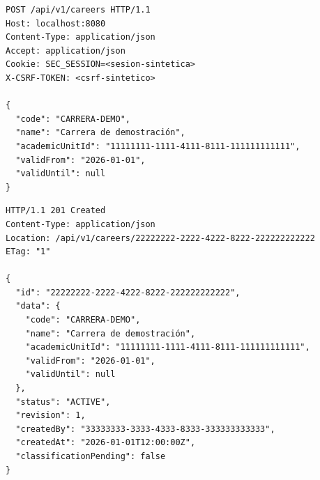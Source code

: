 \documentclass[12pt,a4paper]{report}
\begin{document}
\begin{Verbatim}[breaklines=true,breakanywhere=true,fontsize=\footnotesize]
POST /api/v1/careers HTTP/1.1
Host: localhost:8080
Content-Type: application/json
Accept: application/json
Cookie: SEC_SESSION=<sesion-sintetica>
X-CSRF-TOKEN: <csrf-sintetico>

{
  "code": "CARRERA-DEMO",
  "name": "Carrera de demostración",
  "academicUnitId": "11111111-1111-4111-8111-111111111111",
  "validFrom": "2026-01-01",
  "validUntil": null
}
\end{Verbatim}

\begin{Verbatim}[breaklines=true,breakanywhere=true,fontsize=\footnotesize]
HTTP/1.1 201 Created
Content-Type: application/json
Location: /api/v1/careers/22222222-2222-4222-8222-222222222222
ETag: "1"

{
  "id": "22222222-2222-4222-8222-222222222222",
  "data": {
    "code": "CARRERA-DEMO",
    "name": "Carrera de demostración",
    "academicUnitId": "11111111-1111-4111-8111-111111111111",
    "validFrom": "2026-01-01",
    "validUntil": null
  },
  "status": "ACTIVE",
  "revision": 1,
  "createdBy": "33333333-3333-4333-8333-333333333333",
  "createdAt": "2026-01-01T12:00:00Z",
  "classificationPending": false
}
\end{Verbatim}
\end{document}
